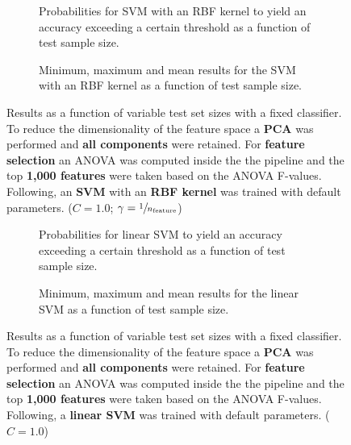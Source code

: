 \begin{figure}
    \captionsetup[subfigure]{justification=justified,singlelinecheck=false}
    \begin{subfigure}[t]{0.61\textwidth}
        
        \caption{Probabilities for SVM with an RBF kernel to yield an accuracy exceeding a certain threshold as a function of test sample size.}
    \end{subfigure}
    \hspace{3.0mm}
    \begin{subfigure}[t]{0.34\textwidth}
        
        \caption{Minimum, maximum and mean results for the SVM with an RBF kernel as a function of test sample size.}
    \end{subfigure}
    \caption[Effects of varying test sample size. SVM (kernel = RBF); Preprocessing: PCA ($n_\text{components} = \text{all}$); ANOVA feature selection ($k_\text{best} = \num{1000}$)]{Results as a function of variable test set sizes with a fixed classifier. To reduce the dimensionality of the feature space a \textbf{PCA} was performed and \textbf{all components} were retained. For \textbf{feature selection} an ANOVA was computed inside the the pipeline and the top \textbf{1,000 features} were taken based on the ANOVA F-values. Following, an \textbf{{SVM}} with an \textbf{{RBF kernel}} was trained with default parameters. ($C=\num{1.0}$; $\gamma=\sfrac{1}{n_\text{feature}}$)}
    \label{fig:PCA_all_components_1000_best_selected_SVC}
\end{figure}

\begin{figure}
    \captionsetup[subfigure]{justification=justified,singlelinecheck=false}
    \begin{subfigure}[t]{0.61\textwidth}
        
        \caption{Probabilities for linear SVM to yield an accuracy exceeding a certain threshold as a function of test sample size.}
    \end{subfigure}
    \hspace{3.0mm}
    \begin{subfigure}[t]{0.34\textwidth}
        
        \caption{Minimum, maximum and mean results for the linear SVM as a function of test sample size.}
    \end{subfigure}
    \caption[Effects of varying test sample size. Linear SVM; Preprocessing: PCA ($n_\text{components} = \text{all}$); ANOVA feature selection ($k_\text{best} = \num{1000}$)]{Results as a function of variable test set sizes with a fixed classifier. To reduce the dimensionality of the feature space a \textbf{PCA} was performed and \textbf{all components} were retained. For \textbf{feature selection} an ANOVA was computed inside the the pipeline and the top \textbf{1,000 features} were taken based on the ANOVA F-values. Following, a \textbf{{linear SVM}} was trained with default parameters. ($C=\num{1.0}$)}
    \label{fig:PCA_all_components_1000_best_selected_LinearSVC}
\end{figure}
